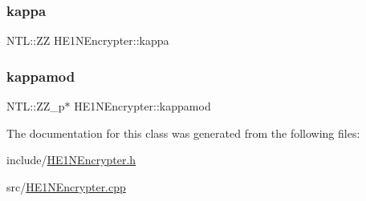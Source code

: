 \subsubsection{\texorpdfstring{kappa}{kappa}}
{\footnotesize\ttfamily N\+T\+L\+::\+ZZ H\+E1\+N\+Encrypter\+::kappa\hspace{0.3cm}{\ttfamily [private]}}

\mbox{\label{classHE1NEncrypter_ae878596c30bc5825c3366366bf2b07fc}} 
\subsubsection{\texorpdfstring{kappamod}{kappamod}}
{\footnotesize\ttfamily N\+T\+L\+::\+Z\+Z\+\_\+p$\ast$ H\+E1\+N\+Encrypter\+::kappamod\hspace{0.3cm}{\ttfamily [private]}}



The documentation for this class was generated from the following files\+:\begin{DoxyCompactItemize}
\item 
include/\hyperlink{HE1NEncrypter_8h}{H\+E1\+N\+Encrypter.\+h}\item 
src/\hyperlink{HE1NEncrypter_8cpp}{H\+E1\+N\+Encrypter.\+cpp}\end{DoxyCompactItemize}
